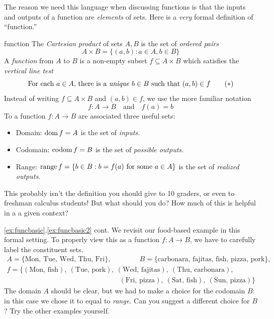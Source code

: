 \bigskip


The reason we need this language when discussing functions is that the inputs and outputs of a function are \emph{elements} of sets. Here is a \emph{very} formal definition of ``function.''

\begin{defn}{}{function}
	The \emph{Cartesian product} of sets $A,B$ is the set of \emph{ordered pairs}
	\[
		A\times B=\bigl\{(a,b):a\in A,b\in B\bigr\}
	\]
	A \emph{function} from $A$ to $B$ is a non-empty subset $f\subseteq A\times B$ which satisfies the \emph{vertical line test}
	\[
		\text{For each $a\in A$, there is a \emph{unique} $b\in B$ such that $(a,b)\in f$} \tag{$\ast$}
	\]
	Instead of writing $f\subseteq A\times B$ and $(a,b)\in f$, we use the more familiar notation
	\[
		f:A\to B\quad\text{and}\quad f(a)=b
	\]
	To a function $f:A\to B$ are associated three useful sets:
	\begin{itemize}\itemsep0pt
	  \item Domain: $\operatorname{dom} f=A$ is the set of \emph{inputs.}
	  \item Codomain: $\operatorname{codom} f=B$ is the set of \emph{possible outputs.}
	  \item Range: $\operatorname{range} f=\{b\in B:b=f(a)\text{ for some }a\in A\}$ is the set of \emph{realized outputs.}
	\end{itemize}
\end{defn}

This probably isn't the definition you should give to 10\th{} graders, or even to freshman calculus students! But what should you do? How much of this is helpful in a a given context?

\goodbreak


\begin{example*}{\ref{ex:funcbasic}.\ref{ex:funcbasic2} cont.}{}
	We revisit our food-based example in this formal setting. To properly view this as a function $f:A\to B$, we have to carefully label the constituent sets.
	\begin{gather*}
		A=\bigl\{\text{Mon, Tue, Wed, Thu, Fri}\bigr\},\qquad\qquad
		B=\bigl\{\text{carbonara, fajitas, fish, pizza, pork}\bigr\},\\[5pt]
		f=\bigl\{(\text{Mon,\ fish}),\ (\text{Tue,\ pork}),\ (\text{Wed,\ fajitas}), \ (\text{Thu,\ carbonara}),\\
		\qquad\qquad\qquad\qquad\qquad\qquad\qquad\qquad
		(\text{Fri,\ pizza}),\ (\text{Sat,\ fish}),\ (\text{Sun,\ pizza})\bigr\}
	\end{gather*}
	The domain $A$ should be clear, but we had to make a choice for the codomain $B$: in this case we chose it to equal to \emph{range.} Can you suggest a different choice for $B$? Try the other examples yourself.
\end{example*}


